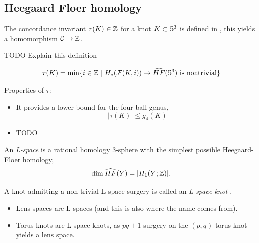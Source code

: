 \subsection{Heegaard Floer homology}

The concordance invariant $\tau(K) \in \mathbb{Z}$ for a knot $K \subset \mathbb{S}^{3}$
is defined in \citep{ozsvath2003knot},
this yields a homomorphism $\mathcal{C} \rightarrow \mathbb{Z}$.

TODO Explain this definition
\begin{definition}
	\begin{equation*}
		\tau(K) = \min \{ i \in \mathbb{Z} \mid 
			H_{*}(\mathcal{F}(K, i))
			\rightarrow
			\widehat{HF}(\mathbb{S}^{3}) 
			\textrm{ is nontrivial} \}
	\end{equation*}
\end{definition}

Properties of $\tau$:
\begin{itemize}
	\item It provides a lower bound for the four-ball genus,
	\[
		| \tau(K) | \le g_{4}(K)
	\]
	\item TODO %
\end{itemize}


\begin{definition}
	An \textit{L-space}  is a rational homology 3-sphere
	with the simplest possible Heegaard-Floer homology,
	\begin{equation*}
		\dim \widehat{HF}(Y) = | H_{1}(Y ; \mathbb{Z}) |.
	\end{equation*}
	
	A knot admitting a non-trivial L-space surgery is
	called an \textit{L-space knot}
	.
\end{definition}

\begin{example}
	\begin{itemize}
		\item Lens spaces are L-spaces (and this is also where the
		name comes from).
		
		\item Torus knots are L-space knots, as
		$pq \pm 1$ surgery on the $(p,q)$-torus knot yields a
		lens space. 
	\end{itemize}
\end{example}

